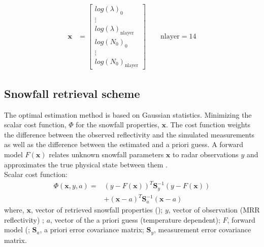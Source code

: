 \begin{align}
	\mathbf{x} & = \begin{bmatrix}
		log(\lambda)_0 	\\
		\vdots 			\\
		log(\lambda)_{\text{nlayer}} 	\\
		log(N_0)_0		\\
		\vdots			\\
		log(N_0)_{\text{nlayer}}		
	\end{bmatrix} \qquad \text{nlayer} = 14
	\label{eq:snow_prop}
\end{align}

\subsection{Snowfall retrieval scheme}\label{sec:ret_scheme}
The optimal estimation method is based on Gaussian statistics. Minimizing the scalar cost function, $\Phi$ for the snowfall properties, $\mathbf{x}$. The cost function weights the difference between the observed reflectivity and the simulated measurements as well as the difference between the estimated and a priori guess. A forward model $F(\mathbf{x})$ relates unknown snowfall parameters $\mathbf{x}$ to radar observations $y$ and approximates the true physical state between them \citep{wood_estimating_2014,cooper_variational_2017}. \\
Scalar cost function:
\begin{equation}
	\begin{split}
		\Phi(\mathbf{x},y,a) = & (y- F(\mathbf{x}))^T \mathbf{S}_y^{-1} 			(y-F(\mathbf{x})) \\
		&+(\mathbf{x}-a)^T \mathbf{S}_{a}^{-1} (\mathbf{x}-a)
	\end{split} \label{eq:scalar_cost_fct}
\end{equation}
where, $\mathbf{x}$, vector of retrieved snowfall properties (); $y$, vector of observation (MRR reflectivity) ; $a$, vector of the a priori guess (temperature dependent); $F$, forward model (; $\mathbf{S}_a$, a priori error covariance matrix; $\mathbf{S}_y$, measurement error covariance matrix.
%
